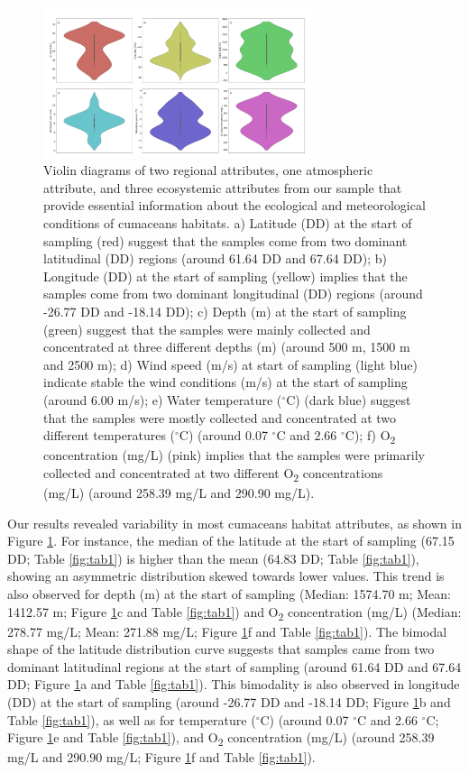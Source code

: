 \begin{figure}[htbp]
    \centering
    \includegraphics[width=0.7\textwidth]{figure1.jpg}
    \caption{Violin diagrams of two regional attributes, one atmospheric attribute, and three ecosystemic attributes from our sample that provide essential information about the ecological and meteorological conditions of cumaceans habitats. a) Latitude (DD) at the start of sampling (red) suggest that the samples come from two dominant latitudinal (DD) regions (around 61.64 DD and 67.64 DD); b) Longitude (DD) at the start of sampling (yellow) implies that the samples come from two dominant longitudinal (DD) regions (around -26.77 DD and -18.14 DD); c) Depth (m) at the start of sampling (green) suggest that the samples were mainly collected and concentrated at three different depths (m) (around 500 m, 1500 m and 2500 m); d) Wind speed (m/s) at start of sampling (light blue) indicate stable the wind conditions (m/s) at the start of sampling (around 6.00 m/s); e) Water temperature ($^\circ$C) (dark blue) suggest that the samples were mostly collected and concentrated at two different temperatures ($^\circ$C) (around 0.07 $^\circ$C and 2.66 $^\circ$C); f) O\textsubscript{2} concentration (mg/L) (pink) implies that the samples were primarily collected and concentrated at two different O\textsubscript{2} concentrations (mg/L) (around 258.39 mg/L and 290.90 mg/L). \label{fig:fig2}}
\end{figure}

Our results revealed variability in most cumaceans habitat attributes, as shown in Figure \ref{fig:fig2}. For instance, the median of the latitude at the start of sampling (67.15 DD; Table \ref{fig:tab1}) is higher than the mean (64.83 DD; Table \ref{fig:tab1}), showing an asymmetric distribution skewed towards lower values. This trend is also observed for depth (m) at the start of sampling (Median: 1574.70 m; Mean: 1412.57 m; Figure \ref{fig:fig2}c and Table \ref{fig:tab1}) and O\textsubscript{2} concentration (mg/L) (Median: 278.77 mg/L; Mean: 271.88 mg/L; Figure \ref{fig:fig2}f and Table \ref{fig:tab1}). The bimodal shape of the latitude distribution curve suggests that samples came from two dominant latitudinal regions at the start of sampling (around 61.64 DD and 67.64 DD; Figure \ref{fig:fig2}a and Table \ref{fig:tab1}). This bimodality is also observed in longitude (DD) at the start of sampling (around -26.77 DD and -18.14 DD; Figure \ref{fig:fig2}b and Table \ref{fig:tab1}), as well as for temperature ($^\circ$C) (around 0.07 $^\circ$C and 2.66 $^\circ$C; Figure \ref{fig:fig2}e and Table \ref{fig:tab1}), and O\textsubscript{2} concentration (mg/L) (around 258.39 mg/L and 290.90 mg/L; Figure \ref{fig:fig2}f and Table \ref{fig:tab1}).


